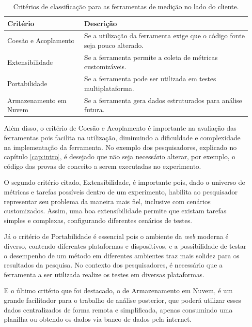 \documentclass[12pt]{tcc}
\begin{document}
	\begin{table}[H]
		\centering
		\caption{Critérios de classificação para as ferramentas de medição no lado do cliente.}
		\begin{tabular}{lp{8.5cm}}
			\toprule
			\textbf{Critério} & \textbf{Descrição}\\
			\midrule 
			Coesão e Acoplamento & Se a utilização da ferramenta exige que o código fonte seja pouco alterado.\\
			Extensibilidade & Se a ferramenta permite a coleta de métricas customizáveis.\\
			Portabilidade & Se a ferramenta pode ser utilizada em testes multiplataforma.\\
			Armazenamento em Nuvem & Se a ferramenta gera dados estruturados para análise futura.\\
			\bottomrule
		\end{tabular}
		\label{tab:criterio-avaliacao-ferramentas}
	\end{table}

	Além disso, o critério de Coesão e Acoplamento é importante na avaliação das ferramentas pois facilita na utilização, diminuindo a dificuldade e complexidade na implementação da ferramenta. No exemplo dos pesquisadores, explicado no capítulo \ref{cap:intro}, é desejado que não seja necessário alterar, por exemplo, o código das provas de conceito a serem executadas no experimento. 
	
	O segundo critério citado, Extensibilidade, é importante pois, dado o universo de métricas e tarefas possíveis dentro de um experimento, habilita ao pesquisador representar seu problema da maneira mais fiel, inclusive com cenários customizados. Assim, uma boa extensibilidade permite que existam tarefas simples e complexas, configurando diferentes cenários de testes.
	
	Já o critério de Portabilidade é essencial pois o ambiente da \emph{web} moderna é diverso, contendo diferentes plataformas e dispositivos, e a possibilidade de testar o desempenho de um método em diferentes ambientes traz mais solidez para os resultados da pesquisa. No contexto dos pesquisadores, é necessário que a ferramenta a ser utilizada realize os testes em diversas plataformas.
	
	E o último critério que foi destacado, o de Armazenamento em Nuvem, é um grande facilitador para o trabalho de análise posterior, que poderá utilizar esses dados centralizados de forma remota e simplificada, apenas consumindo uma planilha ou obtendo os dados via banco de dados pela internet.
\end{document}
